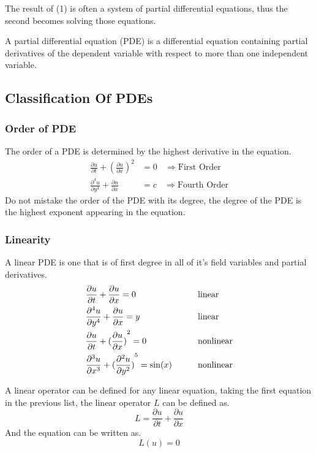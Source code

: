 \documentclass[]{article}
\begin{document}
The result of (1) is often a system of partial differential equations, thus the second becomes solving those equations.
\ \\ 
\begin{definition}
    A partial differential equation (PDE) is a differential equation containing partial derivatives of the dependent variable with respect to more than one independent variable.
\end{definition}

\subsection{Classification Of PDEs}
\subsubsection{Order of PDE}
The order of a PDE is determined by the highest derivative in the equation.
\begin{align*}
\frac{\partial u}{\partial t} + {(\frac{\partial u}{\partial x})}^2 &= 0 \ \ \ \ \Longrightarrow  \text{First Order}
\\
\frac{\partial^4 u}{\partial y^4} + \frac{\partial u}{\partial x} &= c \ \ \ \ \Longrightarrow  \text{Fourth Order}
\end{align*}
Do not mistake the order of the PDE with its degree, the degree of the PDE is the highest exponent appearing in the equation.
\subsubsection{Linearity} 
A linear PDE is one that is of first degree in all of it's field variables and partial derivatives.
\begin{alignat*}{2}
&\frac{\partial u}{\partial t} + \frac{\partial u}{\partial x} = 0 &\quad\quad &\text{linear}
\\
&\frac{\partial^4 u}{\partial y^4} + \frac{\partial u}{\partial x} = y &\quad\quad &\text{linear}
\\
&\frac{\partial u}{\partial t} + {(\frac{\partial u}{\partial x})}^2 = 0 &\quad\quad &\text{nonlinear}
\\
&\frac{\partial^3 u}{\partial x^3} + {(\frac{\partial^2 u}{\partial y^2})}^5 = \sin(x) &\quad\quad &\text{nonlinear}
\end{alignat*}

A linear operator can be defined for any linear equation, taking the first equation in the previous list, the linear operator $L$ can be defined as.
\[
L = \frac{\partial u }{\partial t} + \frac{\partial u}{\partial x}
\]
And the equation can be written as.
\[
    L(u)=0    
\]
\end{document}
